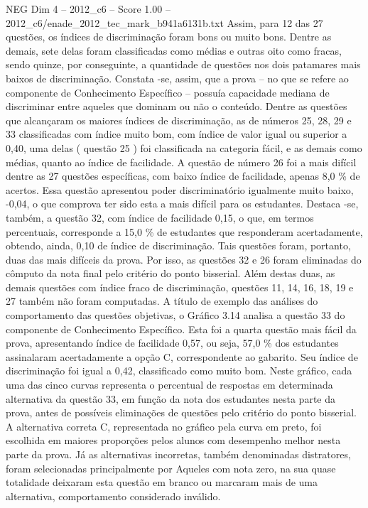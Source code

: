 \begin{textsample}{NEG Dim 4 – 2012\_c6 – Score 1.00 – 2012\_c6/enade\_2012\_tec\_mark\_b941a6131b.txt}
Assim, para 12 das 27 questões, os índices de discriminação foram bons ou muito bons.
Dentre as demais, sete delas foram classificadas como médias e outras oito como fracas, sendo quinze, por conseguinte, a quantidade de questões nos dois patamares mais baixos de discriminação.
Constata -se, assim, que a prova – no que se refere ao componente de Conhecimento Específico – possuía capacidade mediana de discriminar entre aqueles que dominam ou não o conteúdo.
Dentre as questões que alcançaram os maiores índices de discriminação, as de números 25, 28, 29 e 33 classificadas com índice muito bom, com índice de valor igual ou superior a 0,40, uma delas ( questão 25 ) foi classificada na categoria fácil, e as demais como médias, quanto ao índice de facilidade.
A questão de número 26 foi a mais difícil dentre as 27 questões específicas, com baixo índice de facilidade, apenas 8,0 \% de acertos.
Essa questão apresentou poder discriminatório igualmente muito baixo, -0,04, o que comprova ter sido esta a mais difícil para os estudantes.
Destaca -se, também, a questão 32, com índice de facilidade 0,15, o que, em termos percentuais, corresponde a 15,0 \% de estudantes que responderam acertadamente, obtendo, ainda, 0,10 de índice de discriminação.
Tais questões foram, portanto, duas das mais difíceis da prova.
Por isso, as questões 32 e 26 foram eliminadas do cômputo da nota final pelo critério do ponto bisserial.
Além destas duas, as demais questões com índice fraco de discriminação, questões 11, 14, 16, 18, 19 e 27 também não foram computadas.
A título de exemplo das análises do comportamento das questões objetivas, o Gráfico 3.14 analisa a questão 33 do componente de Conhecimento Específico.
Esta foi a quarta questão mais fácil da prova, apresentando índice de facilidade 0,57, ou seja, 57,0 \% dos estudantes assinalaram acertadamente a opção C, correspondente ao gabarito.
Seu índice de discriminação foi igual a 0,42, classificado como muito bom.
Neste gráfico, cada uma das cinco curvas representa o percentual de respostas em determinada alternativa da questão 33, em função da nota dos estudantes nesta parte da prova, antes de possíveis eliminações de questões pelo critério do ponto bisserial.
A alternativa correta C, representada no gráfico pela curva em preto, foi escolhida em maiores proporções pelos alunos com desempenho melhor nesta parte da prova.
Já as alternativas incorretas, também denominadas distratores, foram selecionadas principalmente por Aqueles com nota zero, na sua quase totalidade deixaram esta questão em branco ou marcaram mais de uma alternativa, comportamento considerado inválido.

\end{textsample}
